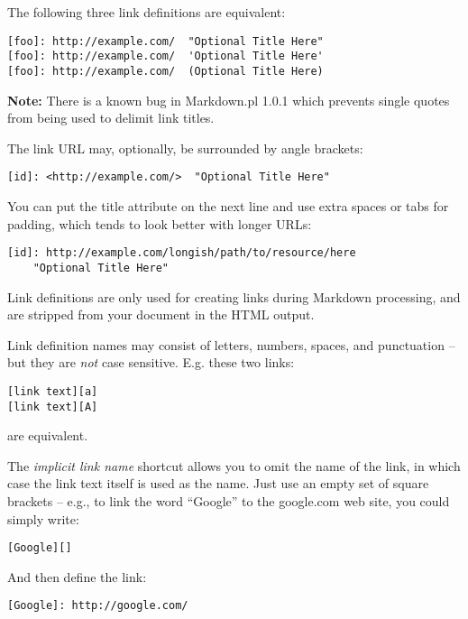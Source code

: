 The following three link definitions are equivalent:

\begin{verbatim}
[foo]: http://example.com/  "Optional Title Here"
[foo]: http://example.com/  'Optional Title Here'
[foo]: http://example.com/  (Optional Title Here)
\end{verbatim}

\textbf{Note:} There is a known bug in Markdown.pl 1.0.1 which prevents
single quotes from being used to delimit link titles.

The link URL may, optionally, be surrounded by angle brackets:

\begin{verbatim}
[id]: <http://example.com/>  "Optional Title Here"
\end{verbatim}

You can put the title attribute on the next line and use extra spaces
or tabs for padding, which tends to look better with longer URLs:

\begin{verbatim}
[id]: http://example.com/longish/path/to/resource/here
    "Optional Title Here"
\end{verbatim}

Link definitions are only used for creating links during Markdown
processing, and are stripped from your document in the HTML output.

Link definition names may consist of letters, numbers, spaces, and
punctuation -- but they are \emph{not} case sensitive. E.g. these two
links:

\begin{verbatim}
[link text][a]
[link text][A]
\end{verbatim}

are equivalent.

The \emph{implicit link name} shortcut allows you to omit the name of the
link, in which case the link text itself is used as the name.
Just use an empty set of square brackets -- e.g., to link the word
``Google'' to the google.com web site, you could simply write:

\begin{verbatim}
[Google][]
\end{verbatim}

And then define the link:

\begin{verbatim}
[Google]: http://google.com/
\end{verbatim}

